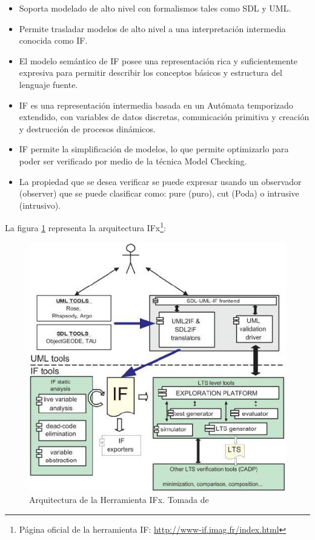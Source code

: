 \begin{itemize}
 \item Soporta modelado de alto nivel con formalismos tales como SDL y 
UML.
\item Permite trasladar modelos de alto nivel a una interpretaci\'on 
intermedia conocida como IF.
\item El modelo sem\'antico de IF posee una representaci\'on rica y 
suficientemente expresiva para permitir describir los conceptos b\'asicos y 
estructura del lenguaje fuente.
 \item IF es una representaci\'on intermedia basada en un Aut\'omata 
temporizado extendido, con variables de datos discretas, comunicaci\'on 
primitiva y creaci\'on y destrucci\'on de procesos din\'amicos.
\item IF permite la simplificaci\'on de modelos, lo que permite optimizarlo 
para poder ser verificado por medio de la t\'ecnica Model Checking.
\item La propiedad que se desea verificar se puede expresar usando un 
observador (observer) que se puede clasificar como: pure (puro), cut (Poda) o 
intrusive (intrusivo).
\end{itemize}

La figura \ref{fig:arquiIF} representa la arquitectura IFx\footnote{P\'agina 
oficial de la herramienta IF: \url{http://www-if.imag.fr/index.html}}:

\begin{figure}[H]
  \centering
  \includegraphics[scale=0.6]{./images/ArquitecturaIF.jpg}
  \caption{Arquitectura de la Herramienta IFx. Tomada de~\cite{Bozga2004}}
  \label{fig:arquiIF}
\end{figure}

